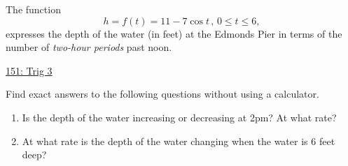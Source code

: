 \documentclass{ximera}
\begin{document}
\begin{question}  \label{Qghghgfdgdsfg0900}

The function
\[
       h = f(t) = 11 - 7 \cos t\, , \, 0\leq t \leq 6 ,
\]
expresses the depth of the water (in feet) at the Edmonds Pier in terms of the number of \emph{two-hour periods} past noon.

\begin{onlineOnly}
    \begin{center}
\end{center}
\end{onlineOnly}

\href{https://www.desmos.com/calculator/4bh7kimi7f}{151: Trig 3}

Find exact answers to the following questions without using a calculator.


\begin{enumerate}
\item Is the depth of the water increasing or decreasing at 2pm? At what rate?

\item At what rate is the depth of the water changing when the water is $6$ feet deep? 

\end{enumerate}
\end{question}
\end{document}
